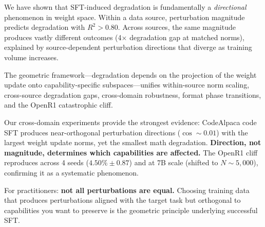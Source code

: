 \documentclass{article}
\begin{document}
We have shown that SFT-induced degradation is fundamentally a \emph{directional} phenomenon in weight space. Within a data source, perturbation magnitude predicts degradation with $R^2 > 0.80$. Across sources, the same magnitude produces vastly different outcomes (4$\times$ degradation gap at matched norms), explained by source-dependent perturbation directions that diverge as training volume increases.

The geometric framework---degradation depends on the projection of the weight update onto capability-specific subspaces---unifies within-source norm scaling, cross-source degradation gaps, cross-domain robustness, format phase transitions, and the OpenR1 catastrophic cliff.

Our cross-domain experiments provide the strongest evidence: CodeAlpaca code SFT produces near-orthogonal perturbation directions ($\cos{\sim}0.01$) with the largest weight update norms, yet the smallest math degradation. \textbf{Direction, not magnitude, determines which capabilities are affected.} The OpenR1 cliff reproduces across 4 seeds ($4.50\% \pm 0.87$) and at 7B scale (shifted to $N{\sim}5{,}000$), confirming it as a systematic phenomenon.

For practitioners: \textbf{not all perturbations are equal.} Choosing training data that produces perturbations aligned with the target task but orthogonal to capabilities you want to preserve is the geometric principle underlying successful SFT.


\end{document}
